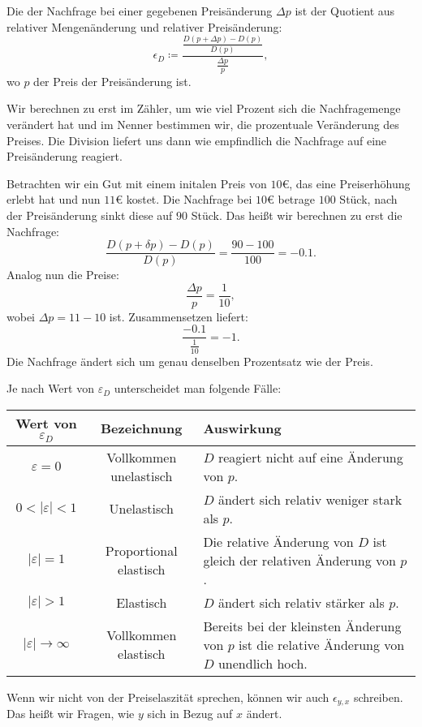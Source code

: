 \begin{definition} 
	Die  der Nachfrage bei einer gegebenen Preisänderung $\Delta p$ ist der Quotient aus relativer Mengenänderung und relativer Preisänderung:
	\[
		\epsilon_D \coloneqq \frac{\frac{D(p+\Delta p)- D(p)}{D(p)}}{\frac{\Delta p}{p}}
		,\]
	wo $p$ der Preis der Preisänderung ist.
\end{definition}
Wir berechnen zu erst im Zähler, um wie viel Prozent sich die Nachfragemenge verändert hat und im Nenner bestimmen wir, die prozentuale Veränderung des Preises.
Die Division liefert uns dann wie empfindlich die Nachfrage auf eine Preisänderung reagiert.

\begin{example}
	Betrachten wir ein Gut mit einem initalen Preis von $10€$, das eine Preiserhöhung erlebt hat und nun $11 €$ kostet. Die Nachfrage bei $10 €$ betrage $100$ Stück, nach der Preisänderung sinkt diese auf $90$ Stück.
	Das heißt wir berechnen zu erst die Nachfrage:
	\[
		\frac{	D(p + \delta p) - D(p)}{D(p)} =  \frac{90- 100}{100} = -0.1
		.\]
	Analog nun die Preise:
	\[
		\frac{\Delta p}{p} = \frac{1}{10}
		,\]
	wobei $\Delta p = 11-10$ ist.
	Zusammensetzen liefert:
	\[
		\frac{-0.1}{\frac{1}{10}} = -1
		.\]
	Die Nachfrage ändert sich um genau denselben Prozentsatz wie der Preis.
\end{example}

Je nach Wert von \(\varepsilon_{D}\) unterscheidet man folgende Fälle:

\begin{center}
	\begin{tabular}{@{}ccp{7.5cm}@{}}
		\toprule
		\textbf{Wert von \(\varepsilon_{D}\)} & \textbf{Bezeichnung}   & \textbf{Auswirkung}                                                                              \\
		\midrule
		\(\varepsilon = 0\)                   & Vollkommen unelastisch & \(D\) reagiert nicht auf eine Änderung von \(p\).                                                \\
		\(0 < |\varepsilon| < 1\)             & Unelastisch            & \(D\) ändert sich relativ weniger stark als \(p\).                                               \\
		\(|\varepsilon| = 1\)                 & Proportional elastisch & Die relative Änderung von \(D\) ist gleich der relativen Änderung von \(p\).                     \\
		\(|\varepsilon| > 1\)                 & Elastisch              & \(D\) ändert sich relativ stärker als \(p\).                                                     \\
		\(|\varepsilon| \rightarrow \infty\)  & Vollkommen elastisch   & Bereits bei der kleinsten Änderung von \(p\) ist die relative Änderung von \(D\) unendlich hoch. \\
		\bottomrule
	\end{tabular}
\end{center}
\begin{remark}
	Wenn wir nicht von der Preiselaszität sprechen, können wir auch $\epsilon_{y,x}$ schreiben. Das heißt wir Fragen, wie $y$ sich in Bezug auf $x$ ändert.
\end{remark}

